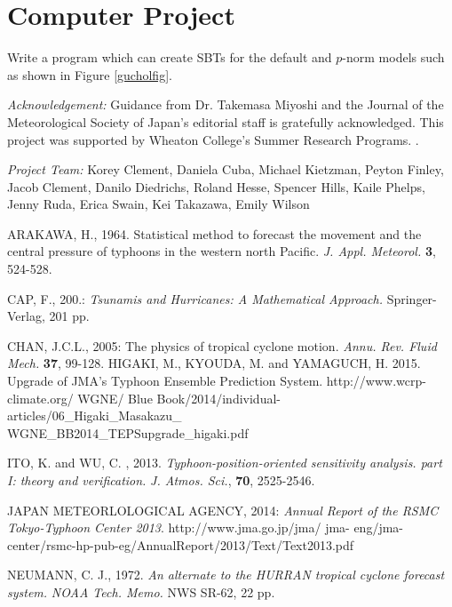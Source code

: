 \documentclass{SBCbookchapter}
\begin{document}
\newpage

\section{Computer Project}
Write a program which can create SBTs for the default and $p$-norm models such as shown in Figure \ref{gucholfig}.





\vspace{1in}

\emph{Acknowledgement:} Guidance from Dr. Takemasa Miyoshi and the Journal of the Meteorological Society of Japan's editorial staff is gratefully acknowledged. This project was supported by Wheaton College's Summer Research Programs.
.
\vspace{.25in}

\emph{Project Team:} Korey Clement, Daniela Cuba, Michael Kietzman, Peyton Finley, Jacob Clement, Danilo Diedrichs, Roland Hesse, Spencer Hills, Kaile Phelps, Jenny Ruda, Erica Swain, Kei Takazawa, Emily Wilson

\newpage
 \begin{thebibliography}{9}

   {\sc  ARAKAWA, H.}, 1964. Statistical method to forecast the movement and the central pressure of typhoons in the western north Pacific. \emph{J. Appl. Meteorol.} {\bf 3}, 524-528.

        {\sc CAP, F.}, 200.: {\em Tsunamis and Hurricanes: A Mathematical Approach.} Springer-Verlag, 201 pp.

 {\sc CHAN, J.C.L.}, 2005: The physics of tropical cyclone motion. \emph{Annu. Rev. Fluid Mech.} {\bf 37}, 99-128.
  {\sc HIGAKI, M.}, {\sc KYOUDA, M.} and {\sc YAMAGUCH, H.} 2015. Upgrade of JMA's Typhoon Ensemble Prediction System. http://www.wcrp-climate.org/ WGNE/ Blue Book/2014/individual-articles/06\_Higaki\_Masakazu\_  \\WGNE\_BB2014\_TEPSupgrade\_higaki.pdf



   {\sc  ITO, K. } and  {\sc WU, C.   }, 2013. \emph{Typhoon-position-oriented sensitivity analysis. part I: theory and verification. } \emph{J. Atmos. Sci.}, {\bf 70}, 2525-2546.

     {\sc JAPAN METEORLOLOGICAL AGENCY}, 2014: \emph{Annual Report of the RSMC Tokyo-Typhoon Center 2013}. http://www.jma.go.jp/jma/ jma- eng/jma-center/rsmc-hp-pub-eg/AnnualReport/2013/Text/Text2013.pdf

 {\sc NEUMANN, C. J.}, 1972. \emph{An alternate to the HURRAN tropical cyclone forecast system.} \emph{NOAA Tech. Memo.} NWS SR-62, 22 pp.

\end{thebibliography}
\end{document}
